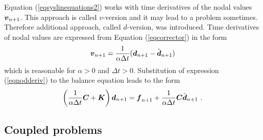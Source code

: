 Equation (\ref{eqsyslinequations2}) works with time derivatives of the nodal values $\mbox{\boldmath$v$}_{n+1}$.
This approach is called $v$-version and it may lead to a problem sometimes. Therefore additional approach,
called $d$-version, was introduced. Time derivatives of nodal values are expressed from Equation (\ref{eqcorrector})
in the form
\begin{eqnarray}\label{eqnodderiv}
\mbox{\boldmath$v$}_{n+1} = \mbox{$\displaystyle\frac{1}{\alpha\Delta t}$} (\mbox{\boldmath$d$}_{n+1} - \tilde{\mbox{\boldmath$d$}}_{n+1})
\end{eqnarray}
which is reasonable for $\alpha>0$ and $\Delta t>0$. Substitution of expression (\ref{eqnodderiv}) to the balance equation
leads to the form
\begin{eqnarray}\label{eqsyslinequations3}
\left(\mbox{$\displaystyle\frac{1}{\alpha\Delta t}$} \mbox{\boldmath$C$} + \mbox{\boldmath$K$}\right) \mbox{\boldmath$d$}_{n+1} = \mbox{\boldmath$f$}_{n+1} + \mbox{$\displaystyle\frac{1}{\alpha\Delta t}$} \mbox{\boldmath$C$} \tilde{\mbox{\boldmath$d$}}_{n+1}\ .
\end{eqnarray}






\subsection{Coupled problems}

